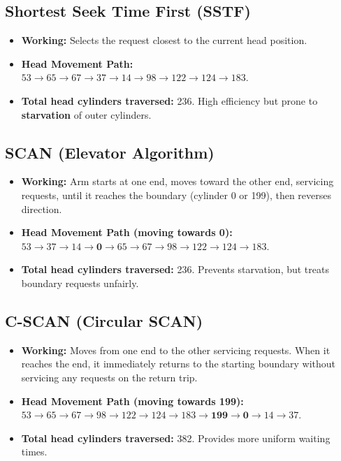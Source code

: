 \documentclass[12pt,a4paper]{article}
\begin{document}
\subsection{Shortest Seek Time First (SSTF)}
\begin{itemize}[leftmargin=*, itemsep=3pt]
  \item \textbf{Working:} Selects the request closest to the current head position.
  \item \textbf{Head Movement Path:} $53 \to 65 \to 67 \to 37 \to 14 \to 98 \to 122 \to 124 \to 183$.
  \item \textbf{Total head cylinders traversed:} 236. High efficiency but prone to \textbf{starvation} of outer cylinders.
\end{itemize}

\subsection{SCAN (Elevator Algorithm)}
\begin{itemize}[leftmargin=*, itemsep=3pt]
  \item \textbf{Working:} Arm starts at one end, moves toward the other end, servicing requests, until it reaches the boundary (cylinder 0 or 199), then reverses direction.
  \item \textbf{Head Movement Path (moving towards 0):} $53 \to 37 \to 14 \to \mathbf{0} \to 65 \to 67 \to 98 \to 122 \to 124 \to 183$.
  \item \textbf{Total head cylinders traversed:} 236. Prevents starvation, but treats boundary requests unfairly.
\end{itemize}

\subsection{C-SCAN (Circular SCAN)}
\begin{itemize}[leftmargin=*, itemsep=3pt]
  \item \textbf{Working:} Moves from one end to the other servicing requests. When it reaches the end, it immediately returns to the starting boundary without servicing any requests on the return trip.
  \item \textbf{Head Movement Path (moving towards 199):} $53 \to 65 \to 67 \to 98 \to 122 \to 124 \to 183 \to \mathbf{199} \to \mathbf{0} \to 14 \to 37$.
  \item \textbf{Total head cylinders traversed:} 382. Provides more uniform waiting times.
\end{itemize}
\end{document}
